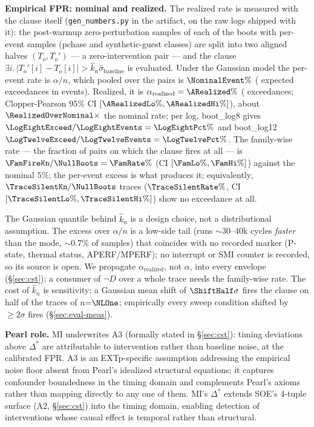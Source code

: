 \documentclass[conference]{IEEEtran}
\newcommand{\sigbase}{\hat{\sigma}_\text{baseline}}
\newcommand{\Dstar}{\Delta^{*}}
\newcommand{\arealized}{\alpha_\text{realized}}
\begin{document}
\textbf{Empirical FPR: nominal and realized.} The realized rate is
measured with the clause itself (\texttt{gen\_numbers.py} in the
artifact, on the raw logs shipped with it): the post-warmup
zero-perturbation samples of each of the
\NullBoots{} boots with per-event samples (pchase and synthetic-guest
classes) are split into two aligned halves $(T_o, T_o')$ --- a
zero-intervention pair --- and the clause $\exists i.\,|T_o'[i] -
T_o[i]| > \hat{k}_n \sigbase$ is evaluated. Under the Gaussian model the
per-event rate is $\alpha/n$, which pooled over the \NullBoots{} pairs
is $\NominalEvent\%$ (\NominalExpected{} expected exceedances in
\NullEvents{} events). Realized, it is $\arealized = \ARealized\%$
(\NullExceedKn{} exceedances; Clopper-Pearson $95\%$ CI
$[\ARealizedLo\%, \ARealizedHi\%]$), about $\RealizedOverNominal\times$
the nominal rate; per log, boot\_log8 gives
$\LogEightExceed/\LogEightEvents = \LogEightPct\%$ and boot\_log12
$\LogTwelveExceed/\LogTwelveEvents = \LogTwelvePct\%$. The family-wise
rate --- the fraction of pairs on which the clause fires at all --- is
$\FamFireKn/\NullBoots = \FamRate\%$ (CI $[\FamLo\%, \FamHi\%]$)
against the nominal $5\%$; the per-event excess is what produces it;
equivalently, $\TraceSilentKn/\NullBoots$ traces ($\TraceSilentRate\%$,
CI $[\TraceSilentLo\%, \TraceSilentHi\%]$) show no exceedance at all.

The Gaussian quantile behind $\hat{k}_n$ is a design choice, not a
distributional assumption. The excess over $\alpha/n$ is a low-side
tail (runs ${\sim}30$--$40$k cycles \emph{faster} than the mode,
${\sim}0.7\%$ of samples) that coincides with no recorded marker
(P-state, thermal status, APERF/MPERF); no interrupt or SMI counter
is recorded, so its source is open. We propagate $\arealized$, not
$\alpha$, into every envelope (\S\ref{sec:cst}); a consumer of
$\neg D$ over a whole trace needs the family-wise rate. The cost of
$\hat{k}_n$ is sensitivity: a Gaussian mean shift of $\ShiftHalf\sigma$
fires the clause on half of the traces of $n{=}\NLOne$; empirically
every sweep condition shifted by ${\geq}2\sigma$ fires
(\S\ref{sec:eval-meas}).

\textbf{Pearl role.} MI underwrites A3 (formally stated in
\S\ref{sec:cst}): timing deviations above $\Dstar$ are attributable
to intervention rather than baseline noise, at the calibrated FPR.
A3 is an EXTp-specific assumption addressing the empirical noise
floor absent from Pearl's idealized structural equations; it
captures confounder boundedness in the timing domain and complements
Pearl's axioms rather than mapping directly to any one of them.
MI's $\Dstar$ extends SOE's 4-tuple surface (A2, \S\ref{sec:cst})
into the timing domain, enabling detection of interventions whose
causal effect is temporal rather than structural.
\end{document}
